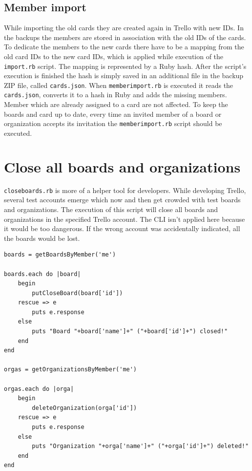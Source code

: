\subsection{Member import}

While importing the old cards they are created again in Trello with new IDs. In the backups the members are stored in association with the old IDs of the cards. To dedicate the members to the new cards there have to be a mapping from the old card IDs to the new card IDs, which is applied while execution of the \texttt{import.rb} script. The mapping is represented by a Ruby hash. After the script's execution is finished the hash is simply saved in an additional file in the backup ZIP file, called \texttt{cards.json}. When \texttt{memberimport.rb} is executed it reads the \texttt{cards.json}, converts it to a hash in Ruby and adds the missing members. Member which are already assigned to a card are not affected. To keep the boards and card up to date, every time an invited member of a board or organization accepts its invitation the \texttt{memberimport.rb} script should be executed.

\section{Close all boards and organizations}

\texttt{closeboards.rb} is more of a helper tool for developers. While developing Trello, several test accounts emerge which now and then get crowded with test boards and organizations. The execution of this script will close all boards and organizations in the specified Trello account. The CLI isn't applied here because it would be too dangerous. If the wrong account was accidentally indicated, all the boards would be lost.

\begin{lstlisting}[aboveskip=1\baselineskip, caption=\texttt{closeboards.rb}, label=listing060]
boards = getBoardsByMember('me')

boards.each do |board|	
	begin
		putCloseBoard(board['id'])
	rescue => e
		puts e.response
	else
		puts "Board "+board['name']+" ("+board['id']+") closed!"
	end	
end

orgas = getOrganizationsByMember('me')

orgas.each do |orga|	
	begin
		deleteOrganization(orga['id'])
	rescue => e
		puts e.response
	else
		puts "Organization "+orga['name']+" ("+orga['id']+") deleted!"
	end	
end
\end{lstlisting}